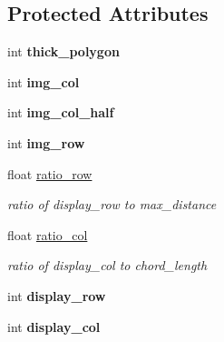 \subsection*{Protected Attributes}
\begin{DoxyCompactItemize}
\item 
\hypertarget{class_top_view_a4aa887937748785f2b1f80039397e0e4}{}int {\bfseries thick\+\_\+polygon}\label{class_top_view_a4aa887937748785f2b1f80039397e0e4}

\item 
\hypertarget{class_top_view_ad62ba0fd78ab35b854a4ee101904d449}{}int {\bfseries img\+\_\+col}\label{class_top_view_ad62ba0fd78ab35b854a4ee101904d449}

\item 
\hypertarget{class_top_view_a39648976b29089f0d8b95504e5a35d06}{}int {\bfseries img\+\_\+col\+\_\+half}\label{class_top_view_a39648976b29089f0d8b95504e5a35d06}

\item 
\hypertarget{class_top_view_a4e9b5eaf65fdb222fac5d2aa40940611}{}int {\bfseries img\+\_\+row}\label{class_top_view_a4e9b5eaf65fdb222fac5d2aa40940611}

\item 
\hypertarget{class_top_view_a97556995e814b8072cde301fe4443384}{}float \hyperlink{class_top_view_a97556995e814b8072cde301fe4443384}{ratio\+\_\+row}\label{class_top_view_a97556995e814b8072cde301fe4443384}

\begin{DoxyCompactList}\small\item\em ratio of display\+\_\+row to max\+\_\+distance \end{DoxyCompactList}\item 
\hypertarget{class_top_view_a13a5f7ab64db7898b53055e4ac65d266}{}float \hyperlink{class_top_view_a13a5f7ab64db7898b53055e4ac65d266}{ratio\+\_\+col}\label{class_top_view_a13a5f7ab64db7898b53055e4ac65d266}

\begin{DoxyCompactList}\small\item\em ratio of display\+\_\+col to chord\+\_\+length \end{DoxyCompactList}\item 
\hypertarget{class_top_view_a21a67bc4d0af8dd26996c6fb007aa3b4}{}int {\bfseries display\+\_\+row}\label{class_top_view_a21a67bc4d0af8dd26996c6fb007aa3b4}

\item 
\hypertarget{class_top_view_a18630cd4f3e2d76e8c5ddc687b54d098}{}int {\bfseries display\+\_\+col}\label{class_top_view_a18630cd4f3e2d76e8c5ddc687b54d098}


\end{DoxyCompactItemize}
